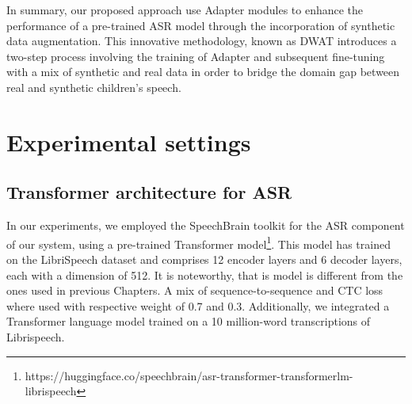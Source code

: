  
In summary, our proposed approach use Adapter modules to enhance the performance of a pre-trained ASR model through the incorporation of synthetic data augmentation. This innovative methodology, known as DWAT introduces a two-step process involving the training of Adapter and subsequent fine-tuning with a mix of synthetic and real data in order to bridge the domain gap between real and synthetic children's speech.





\section{Experimental settings}
\label{section:SOA}
\subsection{Transformer architecture for ASR}
In our experiments, we employed the SpeechBrain toolkit \cite{speechbrain} for the ASR component of our system, using a pre-trained Transformer model\footnote{https://huggingface.co/speechbrain/asr-transformer-transformerlm-librispeech}. This model has trained on the LibriSpeech dataset \cite{librispeech} and comprises 12 encoder layers and 6 decoder layers, each with a dimension of 512. It is noteworthy, that is model is different from the ones used in previous Chapters. A mix of sequence-to-sequence and CTC loss where used with respective weight of 0.7 and 0.3. Additionally, we integrated a Transformer language model trained on a 10 million-word transcriptions of Librispeech.

